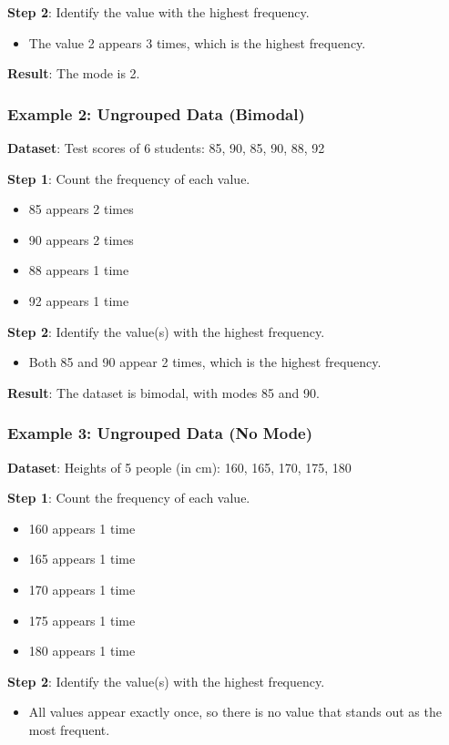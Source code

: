 \documentclass[11pt]{article}
\begin{document}
\textbf{Step 2}: Identify the value with the highest frequency.
\begin{itemize}
    \item The value 2 appears 3 times, which is the highest frequency.
\end{itemize}

\textbf{Result}: The mode is 2.

\subsubsection*{Example 2: Ungrouped Data (Bimodal)}
\textbf{Dataset}: Test scores of 6 students: 85, 90, 85, 90, 88, 92

\textbf{Step 1}: Count the frequency of each value.
\begin{itemize}
    \item 85 appears 2 times
    \item 90 appears 2 times
    \item 88 appears 1 time
    \item 92 appears 1 time
\end{itemize}

\textbf{Step 2}: Identify the value(s) with the highest frequency.
\begin{itemize}
    \item Both 85 and 90 appear 2 times, which is the highest frequency.
\end{itemize}

\textbf{Result}: The dataset is bimodal, with modes 85 and 90.

\subsubsection*{Example 3: Ungrouped Data (No Mode)}
\textbf{Dataset}: Heights of 5 people (in cm): 160, 165, 170, 175, 180

\textbf{Step 1}: Count the frequency of each value.
\begin{itemize}
    \item 160 appears 1 time
    \item 165 appears 1 time
    \item 170 appears 1 time
    \item 175 appears 1 time
    \item 180 appears 1 time
\end{itemize}

\textbf{Step 2}: Identify the value(s) with the highest frequency.
\begin{itemize}
    \item All values appear exactly once, so there is no value that stands out as the most frequent.
\end{itemize}
\end{document}
